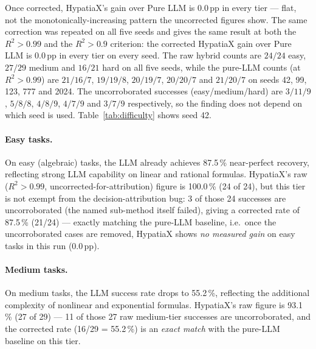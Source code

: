 \documentclass[twoside,11pt]{article}
\newcommand{\Rsq}{R^{2}}
\begin{document}
Once corrected, HypatiaX's gain over Pure LLM is $0.0$\,pp in every tier ---
flat, not the monotonically-increasing pattern the uncorrected figures show. The same correction was repeated on all five seeds and
gives the same result at both the $\Rsq>0.99$ and the $\Rsq>0.9$ criterion:
the corrected HypatiaX gain over Pure LLM is $0.0$\,pp in every tier on every
seed. The raw hybrid counts are $24/24$ easy, $27/29$ medium and $16/21$ hard
on all five seeds, while the pure-LLM counts (at $\Rsq>0.99$) are $21/16/7$,
$19/19/8$, $20/19/7$, $20/20/7$ and $21/20/7$ on seeds 42, 99, 123, 777 and
2024. The uncorroborated successes (easy/medium/hard) are $3/11/9$, $5/8/8$,
$4/8/9$, $4/7/9$ and $3/7/9$ respectively, so the finding does not depend on
which seed is used. Table~\ref{tab:difficulty} shows seed 42.

\paragraph{Easy tasks.}
On easy (algebraic) tasks, the LLM already achieves 87.5\,\% near-perfect recovery,
reflecting strong LLM capability on linear and rational formulas. HypatiaX's
raw ($\Rsq>0.99$, uncorrected-for-attribution) figure is 100.0\,\% (24 of 24),
but this tier is not exempt from the decision-attribution bug: 3 of those 24
successes are uncorroborated (the named sub-method itself failed), giving a
corrected rate of 87.5\,\% (21/24) --- exactly matching
the pure-LLM baseline, i.e.\ once the uncorroborated cases are removed, HypatiaX shows
\emph{no measured gain} on easy tasks in this run ($0.0$\,pp).

\paragraph{Medium tasks.}
On medium tasks, the LLM success rate drops to 55.2\,\%, reflecting the additional
complexity of nonlinear and exponential formulas. HypatiaX's raw figure is 93.1\,\%
(27 of 29) --- 11 of those 27 raw medium-tier successes are uncorroborated, and the
corrected rate (16/29 = 55.2\,\%) is an \emph{exact match} with the pure-LLM
baseline on this tier.
\end{document}
